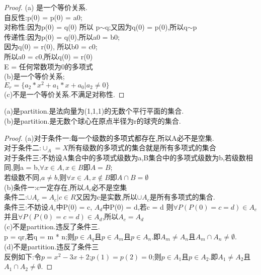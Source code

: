 \documentclass[a4paper, justified]{tufte-handout}
\begin{document}
\begin{problem}[UD Problem 10.13]
\end{problem}

\begin{proof}
  (a) 是一个等价关系.\\
  自反性:p(0) = p(0) = a0;\\
  对称性:因为p(0) = q(0) 所以 p$\sim $q;又因为q(0) = p(0),所以q$\sim$p\\
  传递性:因为p(0) = q(0),所以a0 = b0;\\
  因为q(0) = r(0), 所以b0 = c0;\\
  所以a0 = c0,所以q(0) = r(0)\\
  E = {任何常数项为0的多项式}\\
  (b)是一个等价关系;\\
  $E_r =\{ a_2 * x^2 + a_1 * x + a_0 | a_2 \neq 0\}$\\
  (c)不是一个等价关系.不满足对称性.
\end{proof}

\begin{problem}[UD Problem 11.4]
\end{problem}

\begin{solution}
  (a)是partition.是法向量为(1,1,1)的无数个平行平面的集合.\\
  (b)是partition.是无数个球心在原点半径为r的球壳的集合.
\end{solution}

\begin{problem}[UD Problem 11.8]
\end{problem}

\begin{proof}
  (a)对于条件一:每一个级数的多项式都存在,所以A必不是空集.\\
  对于条件二:$\cup_A = X$所有级数的多项式的集合就是所有多项式的集合\\
  对于条件三:不妨设A集合中的多项式级数为a,B集合中的多项式级数为b,若级数相同,则a = b,$\forall x\in A, x \in B$即$A = B$;\\
  若级数不同,$a \neq b$,则$\forall x\in A, x \notin B$即$A \cap B = \emptyset$\\
  (b)条件一:c一定存在,所以$A_c$必不是空集\\
  条件二:$\cup A_c = {A_c |c \in R}$又因为c是实数,所以$\cup A_c$是所有多项式的集合.\\
  条件三:不妨设$A_c$中P(0) = c, $A_d$中P(0) = d,若c = d 则$\forall P(P(0) = c = d) \in A_c$并且$\forall P(P(0) = c = d) \in A_d$,所以$A_c = A_d$\\
  (c)不是partition.违反了条件三.\\
  p = qr,若q = m * n;则$p \in A_q$且$p \in A_m$且$p \in A_n$.即$A_m \neq A_n$且$A_m \cap A_n \neq \emptyset$.\\
  (d)不是partition.违反了条件三\\
  反例如下:令$p = x^2 -3x + 2$;$p(1) = p(2) = 0$;则$p \in A_1$且$p \in A_2$.即$A_1 \neq A_2$且$A_1 \cap A_2 \neq \emptyset$.
\end{proof}
\end{document}
